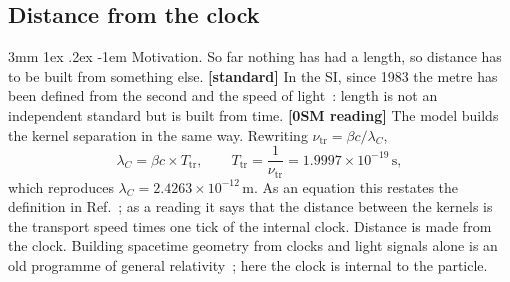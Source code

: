 \documentclass[%
 reprint, amsmath,amssymb, aps, prb, ]{revtex4-2}
\makeatletter
\numberwithin{equation}{section}
\renewcommand\paragraph{%
  \@startsection{paragraph}{4}{\z@}%
    {3mm \@plus 1ex \@minus .2ex}
    {-1em}
    {\normalfont\normalsize\itshape}}
\makeatother
\begin{document}
\subsection{Distance from the clock}

\paragraph{Motivation.} So far nothing has had a length, so distance has to be built from something else. \textbf{[standard]} In the SI, since 1983 the metre has been defined from the second and the speed of light~\cite{ref:si}: length is not an independent standard but is built from time. \textbf{[0SM reading]} The model builds the kernel separation in the same way. Rewriting $\nu_{\mathrm{tr}}=\beta c/\lambda_C$,
\begin{equation}
\lambda_C=\beta c\times T_{\mathrm{tr}},\qquad T_{\mathrm{tr}}=\frac{1}{\nu_{\mathrm{tr}}}=1.9997\times10^{-19}\,\mathrm{s},
\label{eq:distance}
\end{equation}
which reproduces $\lambda_C=2.4263\times10^{-12}\,\mathrm{m}$. As an equation this restates the definition in Ref.~\cite{ref:p10}; as a reading it says that the distance between the kernels is the transport speed times one tick of the internal clock. Distance is made from the clock. Building spacetime geometry from clocks and light signals alone is an old programme of general relativity~\cite{ref:marzke}; here the clock is internal to the particle.
\end{document}
